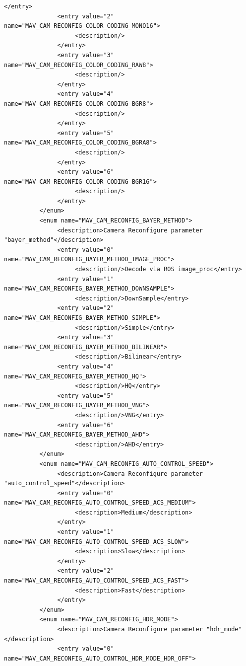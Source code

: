 \begin{lstlisting}[captionpos=b, caption="Definition of \textsc{Skye} specific Mavlink messages", label=app_xml]
               </entry>
               <entry value="2" name="MAV_CAM_RECONFIG_COLOR_CODING_MONO16">
                    <description/>
               </entry>
               <entry value="3" name="MAV_CAM_RECONFIG_COLOR_CODING_RAW8">
                    <description/>
               </entry>
               <entry value="4" name="MAV_CAM_RECONFIG_COLOR_CODING_BGR8">
                    <description/>
               </entry>
               <entry value="5" name="MAV_CAM_RECONFIG_COLOR_CODING_BGRA8">
                    <description/>
               </entry>
               <entry value="6" name="MAV_CAM_RECONFIG_COLOR_CODING_BGR16">
                    <description/>
               </entry>
          </enum>
          <enum name="MAV_CAM_RECONFIG_BAYER_METHOD">
               <description>Camera Reconfigure parameter "bayer_method"</description>
               <entry value="0" name="MAV_CAM_RECONFIG_BAYER_METHOD_IMAGE_PROC">
                    <description/>Decode via ROS image_proc</entry>
               <entry value="1" name="MAV_CAM_RECONFIG_BAYER_METHOD_DOWNSAMPLE">
                    <description/>DownSample</entry>
               <entry value="2" name="MAV_CAM_RECONFIG_BAYER_METHOD_SIMPLE">
                    <description/>Simple</entry>
               <entry value="3" name="MAV_CAM_RECONFIG_BAYER_METHOD_BILINEAR">
                    <description/>Bilinear</entry>
               <entry value="4" name="MAV_CAM_RECONFIG_BAYER_METHOD_HQ">
                    <description/>HQ</entry>
               <entry value="5" name="MAV_CAM_RECONFIG_BAYER_METHOD_VNG">
                    <description/>VNG</entry>
               <entry value="6" name="MAV_CAM_RECONFIG_BAYER_METHOD_AHD">
                    <description/>AHD</entry>
          </enum>
          <enum name="MAV_CAM_RECONFIG_AUTO_CONTROL_SPEED">
               <description>Camera Reconfigure parameter "auto_control_speed"</description>
               <entry value="0" name="MAV_CAM_RECONFIG_AUTO_CONTROL_SPEED_ACS_MEDIUM">
                    <description>Medium</description>
               </entry>
               <entry value="1" name="MAV_CAM_RECONFIG_AUTO_CONTROL_SPEED_ACS_SLOW">
                    <description>Slow</description>
               </entry>
               <entry value="2" name="MAV_CAM_RECONFIG_AUTO_CONTROL_SPEED_ACS_FAST">
                    <description>Fast</description>
               </entry>
          </enum>
          <enum name="MAV_CAM_RECONFIG_HDR_MODE">
               <description>Camera Reconfigure parameter "hdr_mode"</description>
               <entry value="0" name="MAV_CAM_RECONFIG_AUTO_CONTROL_HDR_MODE_HDR_OFF">

\end{lstlisting}
